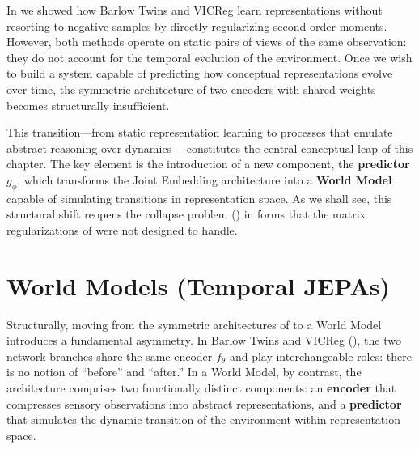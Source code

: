 \documentclass[11pt, oneside, openany]{book}
\begin{document}
In  we showed how Barlow Twins and VICReg learn representations without resorting to negative samples by directly regularizing second-order moments. However, both methods operate on static pairs of views of the same observation: they do not account for the temporal evolution of the environment. Once we wish to build a system capable of predicting how conceptual representations evolve over time, the symmetric architecture of two encoders with shared weights becomes structurally insufficient.

This transition---from static representation learning \cite{bengio2013representation} to processes that emulate abstract reasoning over dynamics \cite{lecun2022path,lecun2025objectives}---constitutes the central conceptual leap of this chapter. The key element is the introduction of a new component, the \textbf{predictor} $g_{\phi}$, which transforms the Joint Embedding architecture into a \textbf{World Model} capable of simulating transitions in representation space. As we shall see, this structural shift reopens the collapse problem () in forms that the matrix regularizations of  were not designed to handle.

\section{World Models (Temporal JEPAs)}
\label{sec:6.1}

Structurally, moving from the symmetric architectures of  to a World Model introduces a fundamental asymmetry. In Barlow Twins and VICReg (), the two network branches share the same encoder $f_{\theta}$ and play interchangeable roles: there is no notion of ``before'' and ``after.'' In a World Model, by contrast, the architecture comprises two functionally distinct components: an \textbf{encoder} that compresses sensory observations into abstract representations, and a \textbf{predictor} that simulates the dynamic transition of the environment within representation space.
\end{document}
